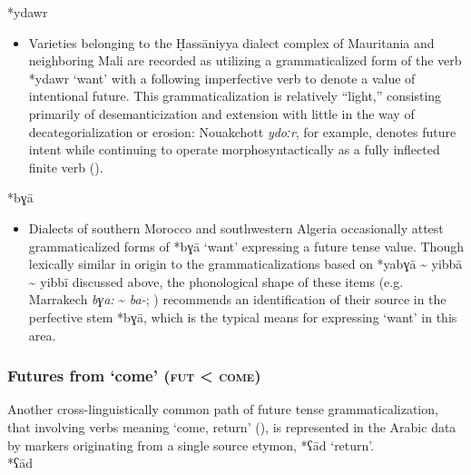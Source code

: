 \documentclass[output=paper]{langsci/langscibook}
\begin{document}
*ydawr

\begin{itemize}

  \item[]
Varieties belonging to the Ḥassāniyya dialect complex of Mauritania and neighboring Mali are recorded as utilizing a grammaticalized form of the verb *ydawr ‘want’ with a following imperfective verb to denote a value of intentional future. This grammaticalization is relatively “light,” consisting primarily of desemanticization and extension with little in the way of decategorialization or erosion: Nouakchott \textit{ydoːr}, for example, denotes future intent while continuing to operate morphosyntactically as a fully inflected finite verb (\citealt{Taine-Cheikh2011hass}).
\end{itemize}
 
*bɣā

\begin{itemize}

  \item[]
Dialects of southern Morocco and southwestern Algeria occasionally attest grammaticalized forms of *bɣā ‘want’ expressing a future tense value. Though lexically similar in origin to the grammaticalizations based on *yabɣā {\textasciitilde} yibbā {\textasciitilde} yibbī discussed above, the phonological shape of these items (e.g. Marrakech \textit{bɣa:} {\textasciitilde} \textit{ba-}; \citealt{Sánchez2014}) recommends an identification of their source in the perfective stem *bɣā, which is the typical means for expressing ‘want’ in this area.
\end{itemize}

\subsubsection{ Futures from ‘come’ (\textsc{fut} < \textsc{come})}

Another cross-linguistically common path of future tense grammaticalization, that involving verbs meaning ‘come, return’ (\citealt{Bybee1994,HeineKuteva2002}), is represented in the Arabic data by markers originating from a single source etymon, *ʕād ‘return’.\\
 
*ʕād
\end{document}
